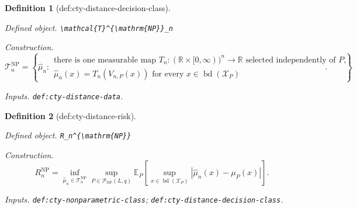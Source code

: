 \documentclass{article}
\newtheorem{definition}{Definition}
\begin{document}
\begin{definition}[def:cty-distance-decision-class]\label{def:cty-distance-decision-class}
\par\smallskip\noindent\emph{Defined object.} \texttt{\textbackslash{}\allowbreak{}mathcal\{T\}\allowbreak{}\textasciicircum{}\{\textbackslash{}\allowbreak{}mathrm\{NP\}\allowbreak{}\}\allowbreak{}\_\allowbreak{}n}
\par\smallskip\noindent\emph{Construction.} \[
 \mathcal T_n^{\mathrm{NP}}
 =\left\{\widehat\mu_n:\begin{array}{l}
 \text{there is one measurable map }T_n:(\mathbb R\times[0,\infty))^n\to\mathbb R
 \text{ selected independently of }P,\\
 \widehat\mu_n(x)=T_n(V_{n,P}(x))
 \text{ for every }x\in\operatorname{bd}(\mathcal X_P)
 \end{array}\right\}.
\]
\par\smallskip\noindent\emph{Inputs.} \texttt{def:\allowbreak{}cty-\allowbreak{}distance-\allowbreak{}data}.
\end{definition}

\begin{definition}[def:cty-distance-risk]\label{def:cty-distance-risk}
\par\smallskip\noindent\emph{Defined object.} \texttt{R\_\allowbreak{}n\textasciicircum{}\{\textbackslash{}\allowbreak{}mathrm\{NP\}\allowbreak{}\}\allowbreak{}}
\par\smallskip\noindent\emph{Construction.} \[R_n^{\mathrm{NP}}=\inf_{\widehat\mu_n\in\mathcal T_n^{\mathrm{NP}}}\sup_{P\in\mathcal P_{\mathrm{NP}}(L,q)}\mathbb E_P\!\left[\sup_{x\in\operatorname{bd}(\mathcal X_P)}|\widehat\mu_n(x)-\mu_P(x)|\right].\]
\par\smallskip\noindent\emph{Inputs.} \texttt{def:\allowbreak{}cty-\allowbreak{}nonparametric-\allowbreak{}class}; \texttt{def:\allowbreak{}cty-\allowbreak{}distance-\allowbreak{}decision-\allowbreak{}class}.
\end{definition}
\end{document}
